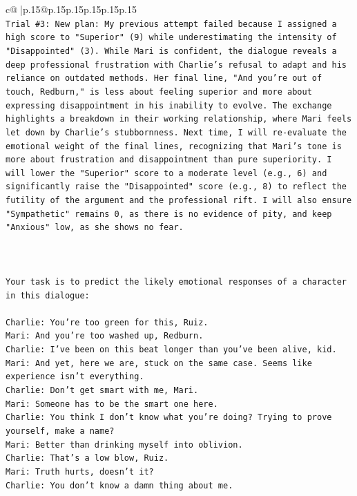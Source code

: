 \documentclass{article}
\begin{document}
{\begin{supertabular}{c@{$\;$}|p{.15\linewidth}@{}p{.15\linewidth}p{.15\linewidth}p{.15\linewidth}p{.15\linewidth}p{.15\linewidth}}
{{{\\ 
\texttt{Trial \#3: New plan: My previous attempt failed because I assigned a high score to "Superior" (9) while underestimating the intensity of "Disappointed" (3). While Mari is confident, the dialogue reveals a deep professional frustration with Charlie's refusal to adapt and his reliance on outdated methods. Her final line, "And you're out of touch, Redburn," is less about feeling superior and more about expressing disappointment in his inability to evolve. The exchange highlights a breakdown in their working relationship, where Mari feels let down by Charlie's stubbornness. Next time, I will re{-}evaluate the emotional weight of the final lines, recognizing that Mari's tone is more about frustration and disappointment than pure superiority. I will lower the "Superior" score to a moderate level (e.g., 6) and significantly raise the "Disappointed" score (e.g., 8) to reflect the futility of the argument and the professional rift. I will also ensure "Sympathetic" remains 0, as there is no evidence of pity, and keep "Anxious" low, as she shows no fear.} \\
\\ 
\\ 
\\ 
\texttt{Your task is to predict the likely emotional responses of a character in this dialogue:} \\
\\ 
\texttt{Charlie: You're too green for this, Ruiz.} \\
\texttt{Mari: And you're too washed up, Redburn.} \\
\texttt{Charlie: I've been on this beat longer than you've been alive, kid.} \\
\texttt{Mari: And yet, here we are, stuck on the same case. Seems like experience isn't everything.} \\
\texttt{Charlie: Don't get smart with me, Mari.} \\
\texttt{Mari: Someone has to be the smart one here.} \\
\texttt{Charlie: You think I don't know what you're doing? Trying to prove yourself, make a name?} \\
\texttt{Mari: Better than drinking myself into oblivion.} \\
\texttt{Charlie: That's a low blow, Ruiz.} \\
\texttt{Mari: Truth hurts, doesn't it?} \\
\texttt{Charlie: You don't know a damn thing about me.} \\
}}}
\end{supertabular}}
\end{document}
